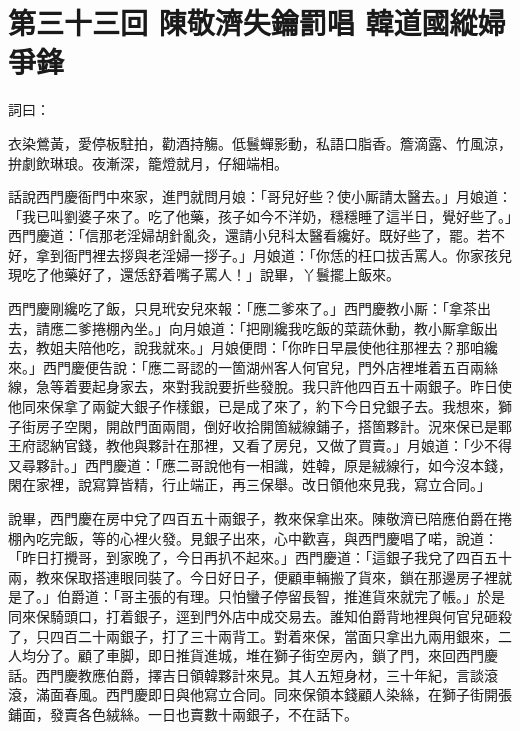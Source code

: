 
\chapter*{第三十三回 陳敬濟失鑰罰唱 韓道國縱婦爭鋒}


詞曰：

\begin{myquote} 
衣染鶯黃，愛停板駐拍，勸酒持觴。低鬟蟬影動，私語口脂香。簷滴露、竹風涼，拚劇飲琳琅。夜漸深，籠燈就月，仔細端相。

\end{myquote} 

話說西門慶衙門中來家，進門就問月娘：「哥兒好些？使小厮請太醫去。」月娘道：「我已叫劉婆子來了。吃了他藥，孩子如今不洋奶，穩穩睡了這半日，覺好些了。」西門慶道：「信那老淫婦胡針亂灸，還請小兒科太醫看纔好。既好些了，罷。若不好，拿到衙門裡去拶與老淫婦一拶子。」月娘道：「你恁的枉口拔舌罵人。你家孩兒現吃了他藥好了，還恁舒着嘴子罵人！」說畢，丫鬟擺上飯來。

西門慶剛纔吃了飯，只見玳安兒來報：「應二爹來了。」西門慶教小厮：「拿茶出去，請應二爹捲棚內坐。」向月娘道：「把剛纔我吃飯的菜蔬休動，教小厮拿飯出去，教姐夫陪他吃，說我就來。」月娘便問：「你昨日早晨使他往那裡去？那咱纔來。」西門慶便告說：「應二哥認的一箇湖州客人何官兒，門外店裡堆着五百兩絲線，急等着要起身家去，來對我說要折些發脫。我只許他四百五十兩銀子。昨日使他同來保拿了兩錠大銀子作樣銀，已是成了來了，約下今日兌銀子去。我想來，獅子街房子空閑，開啟門面兩間，倒好收拾開箇絨線鋪子，搭箇夥計。況來保已是鄆王府認納官錢，教他與夥計在那裡，又看了房兒，又做了買賣。」月娘道：「少不得又尋夥計。」西門慶道：「應二哥說他有一相識，姓韓，原是絨線行，如今沒本錢，閑在家裡，說寫算皆精，行止端正，再三保舉。改日領他來見我，寫立合同。」

說畢，西門慶在房中兌了四百五十兩銀子，教來保拿出來。陳敬濟已陪應伯爵在捲棚內吃完飯，等的心裡火發。見銀子出來，心中歡喜，與西門慶唱了喏，說道：「昨日打攪哥，到家晚了，今日再扒不起來。」西門慶道：「這銀子我兌了四百五十兩，教來保取搭連眼同裝了。今日好日子，便顧車輛搬了貨來，鎖在那邊房子裡就是了。」伯爵道：「哥主張的有理。只怕蠻子停留長智，推進貨來就完了帳。」於是同來保騎頭口，打着銀子，逕到門外店中成交易去。誰知伯爵背地裡與何官兒砸殺了，只四百二十兩銀子，打了三十兩背工。對着來保，當面只拿出九兩用銀來，二人均分了。顧了車脚，即日推貨進城，堆在獅子街空房內，鎖了門，來回西門慶話。西門慶教應伯爵，擇吉日領韓夥計來見。其人五短身材，三十年紀，言談滾滾，滿面春風。西門慶即日與他寫立合同。同來保領本錢顧人染絲，在獅子街開張鋪面，發賣各色絨絲。一日也賣數十兩銀子，不在話下。

